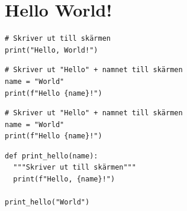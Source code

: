 \section{Hello World!}

\begin{frame}[fragile]
  \begin{example}
    \begin{verbatim}
# Skriver ut till skärmen
print("Hello, World!")
    \end{verbatim}
  \end{example}

  \pause

  \begin{example}
    \begin{verbatim}
# Skriver ut "Hello" + namnet till skärmen
name = "World"
print(f"Hello {name}!")
    \end{verbatim}
  \end{example}
\end{frame}

\begin{frame}[fragile]
  \begin{example}
    \begin{verbatim}
# Skriver ut "Hello" + namnet till skärmen
name = "World"
print(f"Hello {name}!")
    \end{verbatim}
  \end{example}

  \pause

  \begin{example}[Funktioner]
    \begin{verbatim}
def print_hello(name):
  """Skriver ut till skärmen"""
  print(f"Hello, {name}!")

print_hello("World")
    \end{verbatim}
  \end{example}
\end{frame}

